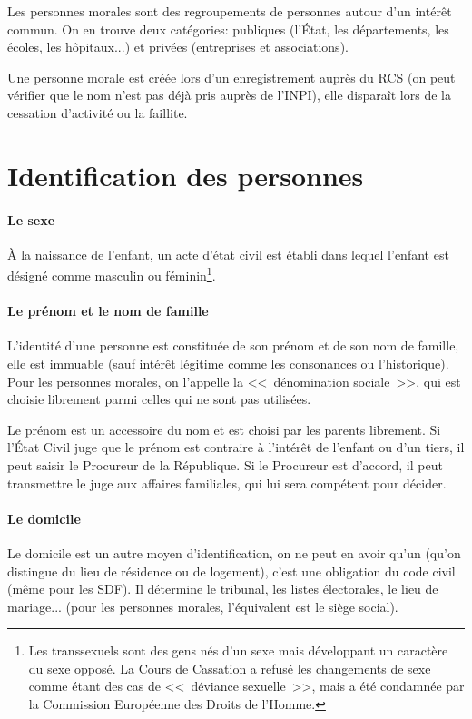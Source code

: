 \documentclass[10pt,a4paper]{article}
\begin{document}
Les personnes morales sont des regroupements de personnes autour d'un intérêt commun. On en trouve deux catégories: publiques (l'État, les départements, les écoles, les hôpitaux...) et privées (entreprises et associations).

Une personne morale est créée lors d'un enregistrement auprès du RCS (on peut vérifier que le nom n'est pas déjà pris auprès de l'INPI), elle disparaît lors de la cessation d'activité ou la faillite.

\section{Identification des personnes}

\paragraph{Le sexe}

À la naissance de l'enfant, un acte d'état civil est établi dans lequel l'enfant est désigné comme masculin ou féminin\footnote{Les transsexuels sont des gens nés d'un sexe mais développant un caractère du sexe opposé. La Cours de Cassation a refusé les changements de sexe comme étant des cas de <<~déviance sexuelle~>>, mais a été condamnée par la Commission Européenne des Droits de l'Homme.}.

\paragraph{Le prénom et le nom de famille}

L'identité d'une personne est constituée de son prénom et de son nom de famille, elle est immuable (sauf intérêt légitime comme les consonances ou l'historique). Pour les personnes morales, on l'appelle la <<~dénomination sociale~>>, qui est choisie librement parmi celles qui ne sont pas utilisées.

Le prénom est un accessoire du nom et est choisi par les parents librement. Si l'État Civil juge que le prénom est contraire à l'intérêt de l'enfant ou d'un tiers, il peut saisir le Procureur de la République. Si le Procureur est d'accord, il peut transmettre le juge aux affaires familiales, qui lui sera compétent pour décider.

\paragraph{Le domicile}

Le domicile est un autre moyen d'identification, on ne peut en avoir qu'un (qu'on distingue du lieu de résidence ou de logement), c'est une obligation du code civil (même pour les SDF). Il détermine le tribunal, les listes électorales, le lieu de mariage... (pour les personnes morales, l'équivalent est le siège social).
\end{document}
